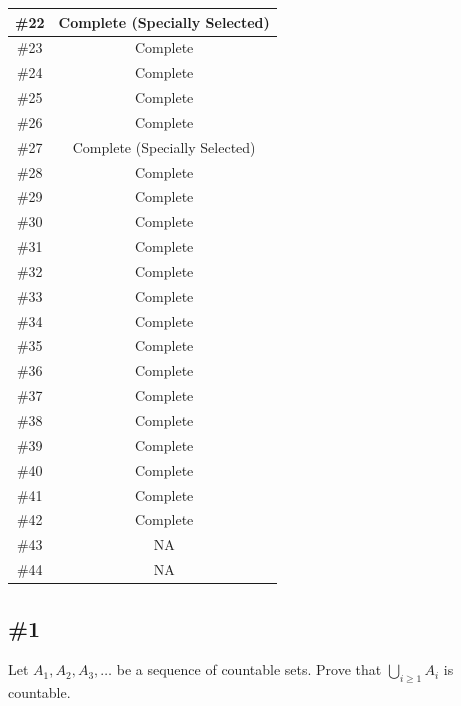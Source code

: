 \documentclass{article}
\theoremstyle{plain} %
\numberwithin{thm}{section} %
\theoremstyle{definition}
\begin{document}
\begin{center}
\begin{tabular}{ | c | c |}
            \hline
            \#22 & Complete (Specially Selected)\\
            \hline
            \#23 & Complete \\
            \hline
            \#24 & Complete \\
            \hline
            \#25 & Complete \\
            \hline
            \#26 & Complete \\
            \hline
            \#27 & Complete (Specially Selected) \\
            \hline
            \#28 & Complete \\
            \hline
            \#29 & Complete \\
            \hline
            \#30 & Complete \\
            \hline
            \#31 & Complete \\
            \hline
            \#32 & Complete \\
            \hline
            \#33 & Complete \\
            \hline
            \#34 & Complete \\
            \hline
            \#35 & Complete \\
            \hline
            \#36 & Complete \\
            \hline
            \#37 & Complete \\
            \hline
            \#38 & Complete \\
            \hline
            \#39 & Complete \\
            \hline
            \#40 & Complete \\
            \hline
            \#41 & Complete \\
            \hline
            \#42 & Complete \\
            \hline
            \#43 & NA \\
            \hline
            \#44 & NA \\
            \hline
        \end{tabular}
    \end{center}
    \subsection{\#1}

    Let $A_1,A_2,A_3,\ldots$ be a sequence of countable sets. Prove that $\bigcup_{i\geq 1} A_i$ is countable.
\end{document}
